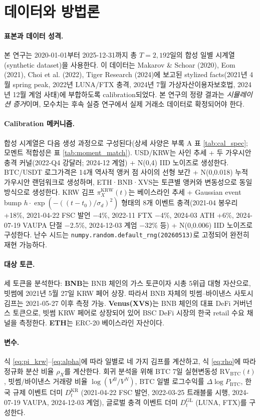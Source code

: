 \documentclass[11pt,a4paper]{article}
\begin{document}
\section{데이터와 방법론}

\paragraph{표본과 데이터 성격.}
본 연구는 2020-01-01부터 2025-12-31까지 총 $T=2{,}192$일의 합성 일별 시계열(synthetic dataset)을 사용한다.
이 데이터는 Makarov \& Schoar (2020), Eom (2021), Choi et al. (2022), Tiger Research (2024)에 보고된
stylized facts(2021년 4월 spring peak, 2022년 LUNA/FTX 충격, 2024년 7월 가상자산이용자보호법, 2024년 12월
계엄 사태)에 부합하도록 calibration되었다. 본 연구의 정량 결과는 \emph{시뮬레이션 증거}이며,
모수치는 후속 실증 연구에서 실제 거래소 데이터로 확정되어야 한다.
\paragraph{Calibration 메커니즘.}
합성 시계열은 다음 생성 과정으로 구성된다(상세 사양은 부록 A 표 \ref{tab:cal_spec}; 모멘트 적합성은 표 \ref{tab:moment_match}).
USD/KRW는 사인 추세 + 두 가우시안 충격 커널(2022-Q4 강달러; 2024-12 계엄) + N(0,4) IID 노이즈로 생성한다.
BTC/USDT 로그가격은 14개 역사적 앵커 점 사이의 선형 보간 + N(0,0.018) 누적 가우시안 랜덤워크로 생성하며,
ETH·BNB·XVS는 토큰별 앵커와 변동성으로 동일 방식으로 생성한다.
KRW 김프 $\pi^{\text{KRW}}_X(t)$는 베이스라인 추세 + Gaussian event bump $h\cdot\exp(-((t-t_0)/\sigma_d)^2)$ 형태의 8개 이벤트 충격(2021-04 봉우리 +18\%,
2021-04-22 FSC 발언 −4\%, 2022-11 FTX −4\%, 2024-03 ATH +6\%, 2024-07-19 VAUPA 단절 −2.5\%, 2024-12-03 계엄 −32\% 등) + N(0,0.006) IID 노이즈로 구성한다.
난수 시드는 \texttt{numpy.random.default\_rng(20260513)}로 고정되어 완전히 재현 가능하다.


\paragraph{대상 토큰.}
세 토큰을 분석한다: \textbf{BNB}는 BNB 체인의 가스 토큰이자 시총 5위급 대형 자산으로,
빗썸에 2021년 5월 27일 KRW 페어 상장. 따라서 BNB 자체의 빗썸--바이낸스 사토시 김프는 2021-05-27 이후 측정 가능.
\textbf{Venus(XVS)}는 BNB 체인의 대표 DeFi 거버넌스 토큰으로, 빗썸 KRW 페어로 상장되어 있어
BSC DeFi 시장의 한국 retail 수요 채널을 측정한다. \textbf{ETH}는 ERC-20 베이스라인 자산이다.

\paragraph{변수.}
식 \eqref{eq:pi_krw}--\eqref{eq:alpha}에 따라 일별로 네 가지 김프를 계산하고,
식 \eqref{eq:rho}에 따라 정규화 분산 비율 $\rho_X$를 계산한다. 회귀 분석을 위해
BTC 7일 실현변동성 $\text{RV}_{\text{BTC}}(t)$, 빗썸/바이낸스 거래량 비율 $\log(V^B/V^N)$,
BTC 일별 로그수익률 $\Delta\log P_{\text{BTC}}$, 한국 규제 이벤트 더미 $D^{\text{KR}}_t$
(2021-04-22 FSC 발언, 2022-03-25 트래블룰 시행, 2024-07-19 VAUPA, 2024-12-03 계엄),
글로벌 충격 이벤트 더미 $D^{\text{GL}}_t$ (LUNA, FTX)를 구성한다.
\end{document}
